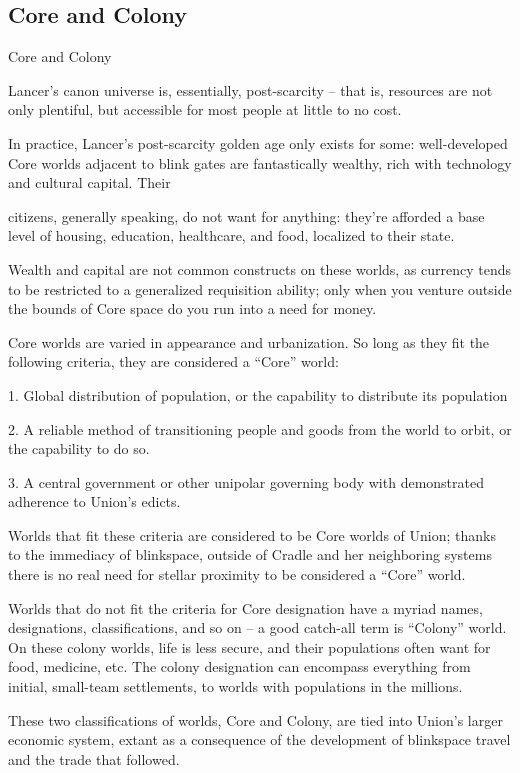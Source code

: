 \subsection{Core and Colony}
Core and Colony

Lancer’s canon universe is, essentially, post-scarcity -- that is, resources are not only plentiful,
but accessible for most people at little to no cost.


In practice, Lancer’s post-scarcity golden age only exists for some: well-developed Core worlds
adjacent to blink gates are fantastically wealthy, rich with technology and cultural capital. Their




citizens, generally speaking, do not want for anything: they’re afforded a base level of housing,
education, healthcare, and food, localized to their state.


Wealth and capital are not common constructs on these worlds, as currency tends to be
restricted to a generalized requisition ability; only when you venture outside the bounds of Core
space do you run into a need for money.


Core worlds are varied in appearance and urbanization. So long as they fit the following criteria,
they are considered a “Core” world:


     1.  Global distribution of population, or the capability to distribute its population

    2.   A reliable method of transitioning people and goods from the world to orbit, or the
         capability to do so.

     3.  A central government or other unipolar governing body with demonstrated adherence to
         Union’s edicts.


Worlds that fit these criteria are considered to be Core worlds of Union; thanks to the immediacy
of blinkspace, outside of Cradle and her neighboring systems there is no real need for stellar
proximity to be considered a “Core” world.


Worlds that do not fit the criteria for Core designation have a myriad names, designations,
classifications, and so on -- a good catch-all term is “Colony” world. On these colony worlds, life
is less secure, and their populations often want for food, medicine, etc. The colony designation
can encompass everything from initial, small-team settlements, to worlds with populations in the
millions.


These two classifications of worlds, Core and Colony, are tied into Union’s larger economic
system, extant as a consequence of the development of blinkspace travel and the trade that
followed.


